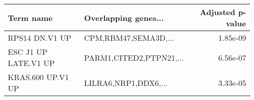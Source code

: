 \begin{tabular}{llr}
\toprule
           Term name &    Overlapping genes... &  Adjusted p-value \\
\midrule
      RPS14 DN.V1 UP &    CPM,RBM47,SEMA3D,... &          1.85e-09 \\
ESC J1 UP LATE.V1 UP & PARM1,CITED2,PTPN21,... &          6.56e-07 \\
   KRAS.600 UP.V1 UP &    LILRA6,NRP1,DDX6,... &          3.33e-05 \\
\bottomrule
\end{tabular}

